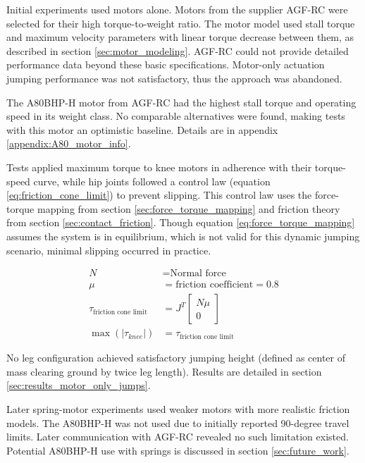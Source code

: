 Initial experiments used motors alone. Motors from the supplier AGF-RC were selected for their high torque-to-weight ratio. The motor model used stall torque and maximum velocity parameters with linear torque decrease between them, as described in section \ref{sec:motor_modeling}. AGF-RC could not provide detailed performance data beyond these basic specifications. Motor-only actuation jumping performance was not satisfactory, thus the approach was abandoned. 

The A80BHP-H motor from AGF-RC had the highest stall torque and operating speed in its weight class. No comparable alternatives were found, making tests with this motor an optimistic baseline. Details are in appendix \ref{appendix:A80_motor_info}.

Tests applied maximum torque to knee motors in adherence with their torque-speed curve, while hip joints followed a control law (equation \ref{eq:friction_cone_limit}) to prevent slipping. This control law uses the force-torque mapping from section \ref{sec:force_torque_mapping} and friction theory from section \ref{sec:contact_friction}. Though equation \ref{eq:force_torque_mapping} assumes the system is in equilibrium, which is not valid for this dynamic jumping scenario, minimal slipping occurred in practice.

\begin{align}
    N &= \text{Normal force} \\
    \mu &= \text{friction coefficient} = 0.8 \\
    \tau_{\text{friction cone limit}} &= J^T 
    \begin{bmatrix}
        N \mu \\
        0
    \end{bmatrix} \\
    \max(|\tau_{knee}|) &= \tau_{\text{friction cone limit}}
    \label{eq:friction_cone_limit}
\end{align}

No leg configuration achieved satisfactory jumping height (defined as center of mass clearing ground by twice leg length). Results are detailed in section \ref{sec:results_motor_only_jumps}.

Later spring-motor experiments used weaker motors with more realistic friction models. The A80BHP-H was not used due to initially reported 90-degree travel limits. Later communication with AGF-RC revealed no such limitation existed. Potential A80BHP-H use with springs is discussed in section \ref{sec:future_work}.


